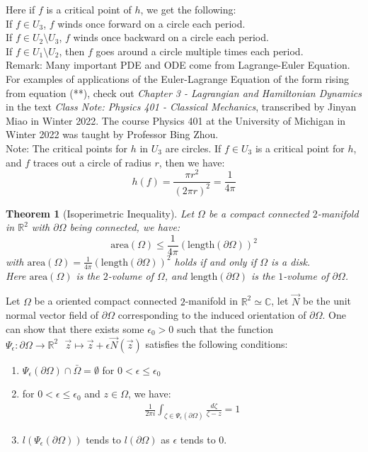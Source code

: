 \documentclass[15pt]{book}
\theoremstyle{break}
\theoremstyle{break}
\newtheorem{thm}{Theorem}[section]
\newcommand{\R}{\mathbb{R}}
\newcommand{\Complex}{\mathbb{C}}
\newcommand{\note}{\color{red}Note: \color{black}}
\newcommand{\remark}{\color{blue}Remark: \color{black}}
\begin{document}
Here if $f$ is a critical point of $h$, we get the following:\\
If $f\in U_3$, $f$ winds once forward on a circle each period.\\
If $f \in U_2 \setminus U_3$, $f$ winds once backward on a circle each period.\\
If $f \in U_1 \setminus U_2$, then $f$ goes around a circle multiple times each period. \\

\remark Many important PDE and ODE come from Lagrange-Euler Equation. For examples of applications of the Euler-Lagrange Equation of the form rising from equation (**), check out \textit{Chapter 3 - Lagrangian and Hamiltonian Dynamics} in the text \textit{Class Note: Physics 401 - Classical Mechanics}, transcribed by Jinyan Miao in Winter 2022. The course Physics 401 at the University of Michigan in Winter 2022 was taught by Professor Bing Zhou.\\

\note The critical points for $h$ in $U_3$ are circles. If $f\in U_3$ is a critical point for $h$, and $f$ traces out a circle of radius $r$, then we have: 
$$h(f) = \frac{\pi r^2}{(2\pi r)^2} = \frac{1}{4\pi}$$

\hfill\break
\begin{thm}[Isoperimetric Inequality]
Let $\Omega$ be a compact connected $2$-manifold in $\R^2$ with $\partial \Omega$ being connected, we have: 
$$\text{area}(\Omega) \leq \frac{1}{4\pi}\left( \text{length}(\partial \Omega)\right)^2$$ 
with $\text{area}(\Omega) = \frac{1}{4\pi}\left( \text{length}(\partial \Omega)\right)^2$ holds if and only if $\Omega$ is a disk.\\ Here $\text{area}(\Omega)$ is the $2$-volume of $\Omega$, and $\text{length}(\partial \Omega)$ is the $1$-volume of $\partial\Omega$.
\end{thm}

\hfill\break
Let $\Omega$ be a oriented compact connected $2$-manifold in $\R^2 \simeq \Complex$, let $\vec{N}$ be the unit normal vector field of $\partial \Omega$ corresponding to the induced orientation of $\partial \Omega$. One can show that there exists some $\epsilon_0>0$ such that the function $\Psi_\epsilon :\partial \Omega \to \R^2 \ \ \ \vec{z} \mapsto \vec{z} + \epsilon \vec{N}(\vec{z})$ satisfies the following conditions:
\begin{enumerate}[topsep=3pt,itemsep=-1ex,partopsep=1ex,parsep=1ex]
\item $\Psi_{\epsilon} (\partial \Omega) \cap \bar{\Omega} = \emptyset $ for $0<\epsilon\leq \epsilon_0$
\item for $0 < \epsilon \leq \epsilon_0$ and $z \in \Omega$, we have:
\begin{align*}
\frac{1}{2\pi i}\int_{\zeta \in \Psi_{\epsilon}(\partial \Omega)} \frac{d\zeta}{\zeta - z} = 1
\end{align*}
\item $l(\Psi_{\epsilon}(\partial \Omega))$ tends to $l(\partial \Omega)$ as $\epsilon $ tends to $0$. 
\end{enumerate} 
\end{document}
